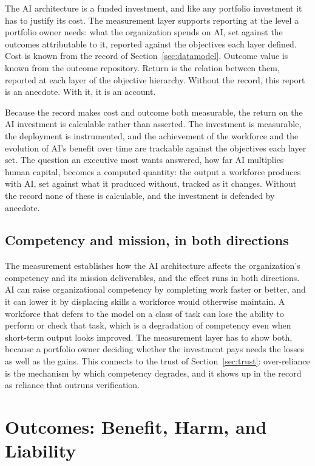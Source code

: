 \documentclass[11pt]{article}
\begin{document}
The AI architecture is a funded investment, and like any portfolio investment it
has to justify its cost. The measurement layer supports reporting at the level a
portfolio owner needs: what the organization spends on AI, set against the
outcomes attributable to it, reported against the objectives each layer defined.
Cost is known from the record of Section~\ref{sec:datamodel}. Outcome value is
known from the outcome repository. Return is the relation between them, reported
at each layer of the objective hierarchy. Without the record, this report is an
anecdote. With it, it is an account.

Because the record makes cost and outcome both measurable, the return on the AI
investment is calculable rather than asserted. The investment is measurable, the
deployment is instrumented, and the achievement of the workforce and the evolution
of AI's benefit over time are trackable against the objectives each layer set. The
question an executive most wants answered, how far AI multiplies human capital,
becomes a computed quantity: the output a workforce produces with AI, set against
what it produced without, tracked as it changes. Without the record none of these
is calculable, and the investment is defended by anecdote.

\subsection{Competency and mission, in both directions}

The measurement establishes how the AI architecture affects the organization's
competency and its mission deliverables, and the effect runs in both directions.
AI can raise organizational competency by completing work faster or better, and it
can lower it by displacing skills a workforce would otherwise maintain. A
workforce that defers to the model on a class of task can lose the ability to
perform or check that task, which is a degradation of competency even when
short-term output looks improved. The measurement layer has to show both, because
a portfolio owner deciding whether the investment pays needs the losses as well as
the gains. This connects to the trust of Section~\ref{sec:trust}: over-reliance is
the mechanism by which competency degrades, and it shows up in the record as
reliance that outruns verification.

\section{Outcomes: Benefit, Harm, and Liability}
\label{sec:risk}
\end{document}
